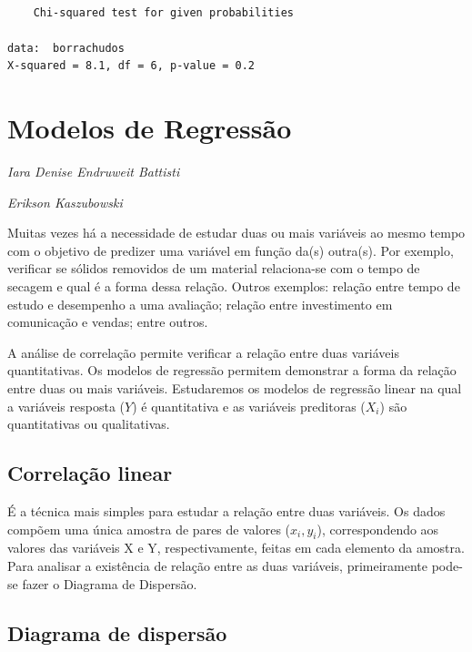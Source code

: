 \documentclass[12pt,brazil,oneside]{book}
\begin{document}
\begin{verbatim}

    Chi-squared test for given probabilities

data:  borrachudos
X-squared = 8.1, df = 6, p-value = 0.2
\end{verbatim}

\hypertarget{reg}{%
\chapter{Modelos de Regressão}\label{reg}}

\begin{flushright}
\emph{Iara Denise Endruweit Battisti}

\emph{Erikson Kaszubowski}
\end{flushright}

Muitas vezes há a necessidade de estudar duas ou mais variáveis ao mesmo
tempo com o objetivo de predizer uma variável em função da(s) outra(s).
Por exemplo, verificar se sólidos removidos de um material relaciona-se
com o tempo de secagem e qual é a forma dessa relação. Outros exemplos:
relação entre tempo de estudo e desempenho a uma avaliação; relação
entre investimento em comunicação e vendas; entre outros.

A análise de correlação permite verificar a relação entre duas variáveis
quantitativas. Os modelos de regressão permitem demonstrar a forma da
relação entre duas ou mais variáveis. Estudaremos os modelos de
regressão linear na qual a variáveis resposta (\(Y\)) é quantitativa e
as variáveis preditoras (\(X_i\)) são quantitativas ou qualitativas.

\hypertarget{correlacao-linear}{%
\section{Correlação linear}\label{correlacao-linear}}

É a técnica mais simples para estudar a relação entre duas variáveis. Os
dados compõem uma única amostra de pares de valores (\(x_i, y_i\)),
correspondendo aos valores das variáveis X e Y, respectivamente, feitas
em cada elemento da amostra. Para analisar a existência de relação entre
as duas variáveis, primeiramente pode-se fazer o Diagrama de Dispersão.

\hypertarget{diagrama-de-dispersao}{%
\section{Diagrama de dispersão}\label{diagrama-de-dispersao}}
\end{document}
